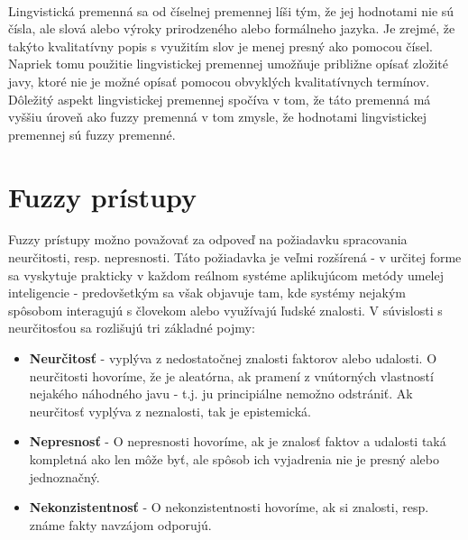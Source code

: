 \paragraph*{}
Lingvistická premenná sa od číselnej premennej líši tým, že jej hodnotami nie sú čísla, ale slová alebo výroky prirodzeného alebo formálneho jazyka. Je zrejmé, že takýto 
kvalitatívny popis s využitím slov je menej presný ako pomocou čísel. Napriek tomu použitie lingvistickej premennej umožňuje približne opísať zložité javy, ktoré nie je možné opísať pomocou obvyklých kvalitatívnych termínov. Dôležitý aspekt lingvistickej premennej spočíva v tom, že táto premenná má vyššiu úroveň ako fuzzy premenná v tom zmysle, že hodnotami lingvistickej premennej sú fuzzy premenné.  \cite{levashenkoProj}


























\pagebreak
\section{Fuzzy prístupy}

Fuzzy prístupy možno považovať za odpoveď na požiadavku spracovania neurčitosti, resp. nepresnosti. Táto požiadavka je veľmi rozšírená - v určitej forme sa vyskytuje prakticky v každom reálnom systéme aplikujúcom metódy umelej inteligencie - predovšetkým sa však objavuje tam, kde systémy nejakým spôsobom interagujú s človekom alebo využívajú ľudské znalosti. 
V súvislosti s neurčitosťou sa rozlišujú tri základné pojmy: \cite{gregorRef13}  %
\begin{itemize}
	\item \textbf{Neurčitosť} - vyplýva z nedostatočnej znalosti faktorov alebo udalosti. O neurčitosti hovoríme, že je aleatórna, ak pramení z vnútorných vlastností nejakého náhodného javu - t.j. ju principiálne nemožno odstrániť. Ak neurčitosť vyplýva z neznalosti, tak je epistemická. 
	\item \textbf{Nepresnosť} - O nepresnosti hovoríme, ak je znalosť faktov a udalosti taká kompletná ako len môže byť, ale spôsob ich vyjadrenia nie je presný alebo jednoznačný. 
	\item \textbf{Nekonzistentnosť} - O nekonzistentnosti hovoríme, ak si znalosti, resp. známe fakty navzájom odporujú. 
\end{itemize}

